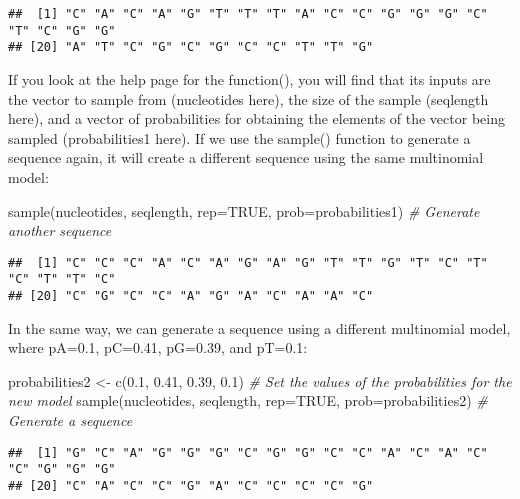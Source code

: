 \documentclass[
]{book}
\newenvironment{Shaded}{\begin{snugshade}}{\end{snugshade}}
\newcommand{\AttributeTok}[1]{\textcolor[rgb]{0.77,0.63,0.00}{#1}}
\newcommand{\CommentTok}[1]{\textcolor[rgb]{0.56,0.35,0.01}{\textit{#1}}}
\newcommand{\ConstantTok}[1]{\textcolor[rgb]{0.00,0.00,0.00}{#1}}
\newcommand{\FloatTok}[1]{\textcolor[rgb]{0.00,0.00,0.81}{#1}}
\newcommand{\FunctionTok}[1]{\textcolor[rgb]{0.00,0.00,0.00}{#1}}
\newcommand{\NormalTok}[1]{#1}
\newcommand{\OtherTok}[1]{\textcolor[rgb]{0.56,0.35,0.01}{#1}}
\begin{document}
\begin{verbatim}
##  [1] "C" "A" "C" "A" "G" "T" "T" "T" "A" "C" "C" "G" "G" "G" "C" "T" "C" "G" "G"
## [20] "A" "T" "C" "G" "C" "G" "C" "C" "T" "T" "G"
\end{verbatim}

If you look at the help page for the function(), you will find that its inputs are the vector to sample from (nucleotides here), the size of the sample (seqlength here), and a vector of probabilities for obtaining the elements of the vector being sampled (probabilities1 here). If we use the sample() function to generate a sequence again, it will create a different sequence using the same multinomial model:

\begin{Shaded}
\begin{Highlighting}[]
\FunctionTok{sample}\NormalTok{(nucleotides, seqlength, }\AttributeTok{rep=}\ConstantTok{TRUE}\NormalTok{, }\AttributeTok{prob=}\NormalTok{probabilities1) }\CommentTok{\# Generate another sequence}
\end{Highlighting}
\end{Shaded}

\begin{verbatim}
##  [1] "C" "C" "C" "A" "C" "A" "G" "A" "G" "T" "T" "G" "T" "C" "T" "C" "T" "T" "C"
## [20] "C" "G" "C" "C" "A" "G" "A" "C" "A" "A" "C"
\end{verbatim}

In the same way, we can generate a sequence using a different multinomial model, where pA=0.1, pC=0.41, pG=0.39, and pT=0.1:

\begin{Shaded}
\begin{Highlighting}[]
\NormalTok{probabilities2 }\OtherTok{\textless{}{-}} \FunctionTok{c}\NormalTok{(}\FloatTok{0.1}\NormalTok{, }\FloatTok{0.41}\NormalTok{, }\FloatTok{0.39}\NormalTok{, }\FloatTok{0.1}\NormalTok{) }\CommentTok{\# Set the values of the probabilities for the new model}
\FunctionTok{sample}\NormalTok{(nucleotides, seqlength, }\AttributeTok{rep=}\ConstantTok{TRUE}\NormalTok{, }\AttributeTok{prob=}\NormalTok{probabilities2) }\CommentTok{\# Generate a sequence}
\end{Highlighting}
\end{Shaded}

\begin{verbatim}
##  [1] "G" "C" "A" "G" "G" "G" "C" "G" "G" "C" "C" "A" "C" "A" "C" "C" "G" "G" "G"
## [20] "C" "A" "C" "C" "G" "A" "C" "C" "C" "C" "G"
\end{verbatim}
\end{document}
